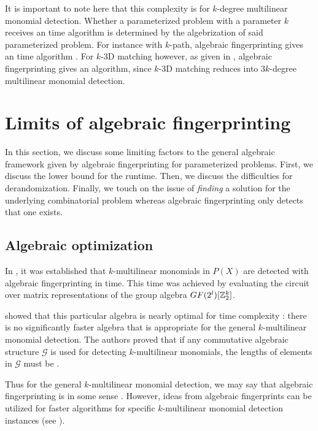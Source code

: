 It is important to note here that this complexity is for $k$-degree 
multilinear monomial detection. Whether a parameterized problem with a parameter 
$k$ receives an  time algorithm is determined by the algebrization 
of said parameterized problem. 
For instance with $k$-path, algebraic fingerprinting gives an  
time algorithm \cite{Williams09}. 
For $k$-3D matching however, as given in , 
algebraic fingerprinting gives an  algorithm, since 
$k$-3D matching reduces into $3k$-degree multilinear monomial detection.


\section{Limits of algebraic fingerprinting}
\label{sect:limits}

In this section, we discuss some limiting factors to the general 
algebraic framework given by 
algebraic fingerprinting for parameterized problems. First, 
we discuss the lower bound for the runtime. Then, we discuss 
the difficulties for derandomization. Finally, we touch on the issue of 
\emph{finding} a solution for the underlying combinatorial problem 
whereas algebraic fingerprinting only detects that one exists.

\subsection{Algebraic optimization}
\label{sect:algebra_is_optimal}

In , it was established that $k$-multilinear monomials 
in $P(X)$ are detected with 
algebraic fingerprinting in  time. 
This time was achieved by evaluating the circuit over matrix 
representations of the group algebra $GF(2^l)[\mathbb Z_2^k]$.

\citeauthor{KouWil09} showed that this particular algebra is nearly optimal 
for time complexity \cite{KouWil09}: there is no significantly faster algebra that 
is appropriate for the general $k$-multilinear monomial detection. 
The authors proved that if any commutative algebraic structure $\mathcal{G}$ is 
used for detecting $k$-multilinear monomials, 
the lengths of elements in $\mathcal{G}$ must be .

Thus for the general $k$-multilinear monomial detection, we may say 
that algebraic fingerprinting is in some sense
. 
However, 
ideas from algebraic fingerprints can be utilized for faster algorithms for 
specific $k$-multilinear monomial detection instances (see ).

